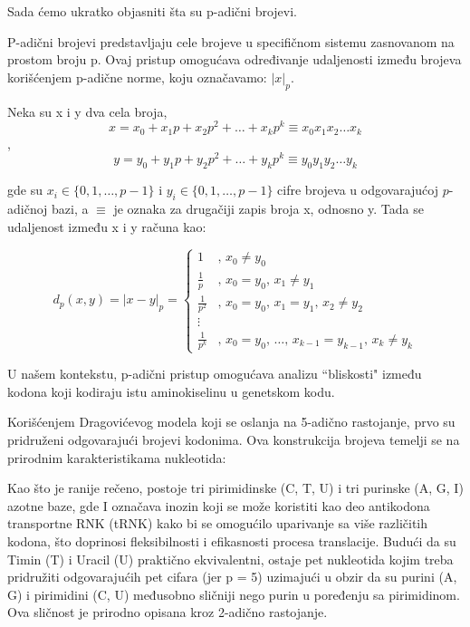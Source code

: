 \documentclass[a4paper,12pt]{article}
\begin{document}
\bigskip
Sada ćemo ukratko objasniti šta su p-adični brojevi.

\smallskip
P-adični brojevi predstavljaju cele brojeve u specifičnom sistemu zasnovanom na prostom broju p. Ovaj pristup omogućava određivanje udaljenosti između brojeva korišćenjem p-adične norme, koju označavamo: \(\lvert x \rvert_{p}\).

Neka su x i y dva cela broja, 
\[ x = x_{0} + x_{1}p + x_{2}p^{2} + \ldots + x_{k}p^{k} \equiv x_{0}x_{1}x_{2}\ldots x_{k}
\], 
\[ y = y_{0} + y_{1}p + y_{2}p^{2} + \ldots + y_{k}p^{k} \equiv y_{0}y_{1}y_{2}\ldots y_{k}
\]

\bigskip
\noindent
gde su \( x_i \in \{0, 1, \ldots, p-1\} \) i \( y_i \in \{0, 1, \ldots, p-1\} \) cifre brojeva u odgovarajućoj \( p \)-adičnoj bazi, a \( \equiv \) je oznaka za drugačiji zapis broja x, odnosno y. Tada se udaljenost između x i y računa kao:

\[
d_{p}(x, y) = |x - y|_{p} = \begin{cases}
    1 & \text{, } x_{0} \neq y_{0} \\
    \frac{1}{p} & \text{, } x_{0} = y_{0} \text{, } x_{1} \neq y_{1} \\
    \frac{1}{p^2} & \text{, } x_{0} = y_{0} \text{, } x_{1} = y_{1} \text{, } x_{2} \neq y_{2} \\
    \vdots & \\
    \frac{1}{p^k} & \text{, } x_{0} = y_{0} \text{, } \ldots \text{, } x_{k-1} = y_{k-1} \text{, } x_{k} \neq y_{k}
\end{cases}
\]

\bigskip
U našem kontekstu, p-adični pristup omogućava analizu “bliskosti" između kodona koji kodiraju istu aminokiselinu u genetskom kodu. 

\medskip
Korišćenjem Dragovićevog modela koji se oslanja na 5-adično rastojanje, prvo su pridruženi odgovarajući brojevi kodonima. Ova konstrukcija brojeva temelji se na prirodnim karakteristikama nukleotida:

Kao što je ranije rečeno, postoje tri pirimidinske (C, T, U) i tri purinske (A, G, I) azotne baze, gde I označava inozin koji se može koristiti kao deo antikodona transportne RNK (tRNK) kako bi se omogućilo uparivanje sa više različitih kodona, što doprinosi fleksibilnosti i efikasnosti procesa translacije. Budući da su Timin (T) i Uracil (U) praktično ekvivalentni, ostaje pet nukleotida kojim treba pridružiti odgovarajućih pet cifara (jer p = 5) uzimajući u obzir da su purini (A, G) i pirimidini (C, U) međusobno sličniji nego purin u poređenju sa pirimidinom. Ova sličnost je prirodno opisana kroz 2-adično rastojanje. 
\end{document}
